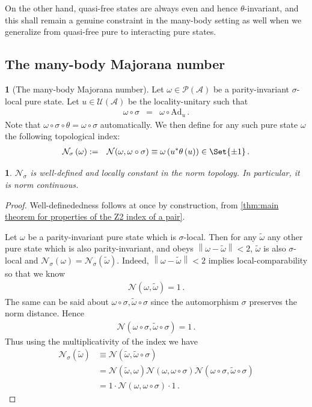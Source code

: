 \documentclass[a4paper,10pt]{article}
\numberwithin{equation}{section}
\theoremstyle{plain}
\theoremstyle{plain}
\newtheorem{lem}[lem]{\protect\lemmaname}
\theoremstyle{plain}
\theoremstyle{plain}
\theoremstyle{plain}
\theoremstyle{remark}
\theoremstyle{definition}
\newtheorem{defn}[defn]{\protect\definitionname}
\providecommand{\definitionname}{Definition}
\providecommand{\lemmaname}{Lemma}
\newcommand{\calN}{\mathcal{N}}
\newcommand\norm[1]{\left\lVert#1\right\rVert}
\newcommand{\eq}[1]{\begin{align*}#1\end{align*}}
\begin{document}
On the other hand, quasi-free states are always even and hence $\theta$-invariant,
and this shall remain a genuine constraint in the many-body setting
as well when we generalize from quasi-free pure to interacting pure states.

\subsection{The many-body Majorana number}
\begin{defn}[The many-body Majorana number]
 Let $\omega\in\mathcal{P}\left(\mathcal{A}\right)$ be a parity-invariant
$\sigma$-local pure state. Let $u\in\mathcal{U}\left(\mathcal{A}\right)$ be the
locality-unitary such that 
\begin{eqnarray*}
\omega\circ\sigma & = & \omega\circ\text{Ad}_{u}\,.
\end{eqnarray*}
Note that $\omega\circ\sigma\circ\theta=\omega\circ\sigma$ automatically.
We then define for any such pure state $\omega$ the following topological
index: 
\begin{eqnarray*}
\mathcal{N}_{\sigma}\left(\omega\right) & := & \calN(\omega,\omega\circ\sigma)\equiv\omega\left(u^{\ast}\theta\left(u\right)\right)\in\Set{\pm1}\,.
\end{eqnarray*}
\end{defn}

\begin{lem}
$\mathcal{N}_{\sigma}$ is well-defined and locally constant in the norm
topology. In particular, it is norm continuous.
\end{lem}

\begin{proof}
Well-definededness follows at once by construction, from \cref{thm:main theorem for properties of the Z2 index of a pair}.

Let $\omega$ be a parity-invariant pure state which is $\sigma$-local. Then for any $\widetilde{\omega}$ any other pure state which is also parity-invariant, and obeys $\norm{\omega-\widetilde{\omega}}<2$, $\widetilde{\omega}$ is also $\sigma$-local and $\mathcal{N}_{\sigma}(\omega)=\mathcal{N}_{\sigma}(\widetilde{\omega})$. Indeed, $\norm{\omega-\widetilde{\omega}}<2$ implies local-comparability so that we know 
\eq{
\calN(\omega,\widetilde{\omega}) = 1\,.
} The same can be said about $\omega\circ\sigma,\widetilde{\omega}\circ\sigma$ since the automorphism $\sigma$ preserves the norm distance. Hence 
\eq{
\calN(\omega\circ\sigma,\widetilde{\omega}\circ\sigma) = 1\,.
} Thus using the multiplicativity of the index we have
\eq{
\calN_\sigma(\widetilde{\omega}) &\equiv \calN(\widetilde{\omega},\widetilde{\omega}\circ\sigma)\\
&= \calN(\widetilde{\omega},\omega)\calN(\omega,\omega\circ\sigma)\calN(\omega\circ\sigma,\widetilde{\omega}\circ\sigma)\\
&= 1\cdot \calN(\omega,\omega\circ\sigma) \cdot 1\,.
}

\end{proof}
%
\end{document}
